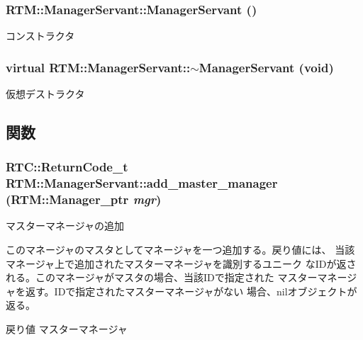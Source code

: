\subsubsection[{ManagerServant}]{\setlength{\rightskip}{0pt plus 5cm}RTM::ManagerServant::ManagerServant ()}\label{classRTM_1_1ManagerServant_aada9f52af552ed6d2e7de04f9b196a25}
コンストラクタ 
\subsubsection[{$\sim$ManagerServant}]{\setlength{\rightskip}{0pt plus 5cm}virtual RTM::ManagerServant::$\sim$ManagerServant (void)\hspace{0.3cm}{\ttfamily  [virtual]}}\label{classRTM_1_1ManagerServant_ad4bb0182c1b1e2f2223155a37bbabb7e}


仮想デストラクタ 



\subsection{関数}
\subsubsection[{add\_\-master\_\-manager}]{\setlength{\rightskip}{0pt plus 5cm}RTC::ReturnCode\_\-t RTM::ManagerServant::add\_\-master\_\-manager (RTM::Manager\_\-ptr {\em mgr})}\label{classRTM_1_1ManagerServant_a129cd02f5e6d8a68eea578e5ad57cd81}


マスターマネージャの追加 

このマネージャのマスタとしてマネージャを一つ追加する。戻り値には、 当該マネージャ上で追加されたマスターマネージャを識別するユニーク なIDが返される。このマネージャがマスタの場合、当該IDで指定された マスターマネージャを返す。IDで指定されたマスターマネージャがない 場合、nilオブジェクトが返る。

\begin{DoxyReturn}{戻り値}
マスターマネージャ 
\end{DoxyReturn}
